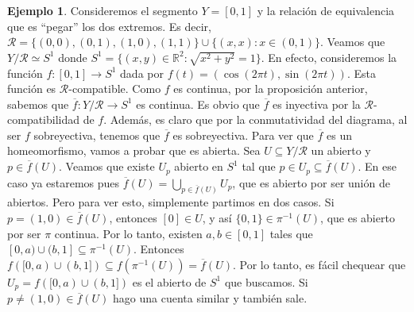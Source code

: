 \documentclass[12pt]{book}
\theoremstyle{definition}
\newtheorem{ex}[teo]{Ejemplo}
\newcommand{\RR}{\mathbb{R}}      %
\newcommand{\Rel}{\mathscr{R}}
\begin{document}
\begin{ex}
Consideremos el segmento $Y=[0,1]$ y la relación de equivalencia que es "`pegar"' los dos extremos. Es decir, $\Rel = \{(0,0),(0,1),(1,0),(1,1)\}\cup \{(x,x):x\in (0,1)\}$. Veamos que $Y/\Rel\simeq S^1$ donde $S^1 = \{(x,y)\in\RR^2 : \sqrt{x^2 +y^2}=1\}$. En efecto, consideremos la función $f:[0,1]\to S^1$ dada por $f(t) = (\cos(2\pi t),\sin(2\pi t))$. Esta función es $\Rel$-compatible. Como $f$ es continua, por la proposición anterior, sabemos que $\overline{f}:Y/\Rel\to S^1$ es continua. Es obvio que $\overline{f}$ es inyectiva por la $\Rel$-compatibilidad de $f$. Además, es claro que por la conmutatividad del diagrama, al ser $f$ sobreyectiva, tenemos que $\overline{f}$ es sobreyectiva. Para ver que $\overline{f}$ es un homeomorfismo, vamos a probar que es abierta. Sea $U\subseteq Y/\Rel$ un abierto y $p\in \overline{f}(U)$. Veamos que existe $U_p$ abierto en $S^1$ tal que $p\in U_p\subseteq \overline{f}(U)$. En ese caso ya estaremos pues $\overline{f}(U)=\displaystyle\bigcup_{p\in\overline{f}(U)} U_p$, que es abierto por ser unión de abiertos. Pero para ver esto, simplemente partimos en dos casos. Si $p=(1,0)\in\overline{f}(U)$, entonces $[0]\in U$, y así $\{0,1\}\in\pi^{-1}(U)$, que es abierto por ser $\pi$ continua. Por lo tanto, existen $a,b\in [0,1]$ tales que $[0,a)\cup (b,1]\subseteq \pi^{-1}(U)$. Entonces $f([0,a)\cup (b,1])\subseteq f(\pi^{-1}(U)) =\overline{f}(U)$. Por lo tanto, es fácil chequear que $U_p = f([0,a)\cup(b,1])$ es el abierto de $S^1$ que buscamos. Si $p\neq (1,0)\in \overline{f}(U)$ hago una cuenta similar y también sale.
\end{ex}
\end{document}
